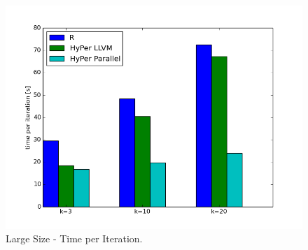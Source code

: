 \begin{figure}[htsb]
  \centering
  \includegraphics[scale=0.4, trim="0cm 1.5cm 0cm 0cm"]{figures/charts/final_150M}
  \caption[Large Size - Time per Iteration]{Large Size - Time per Iteration.}
  \label{fig:final_150M}
\end{figure}


